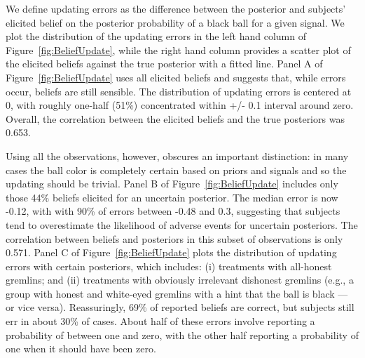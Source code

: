 \documentclass[12pt,a4paper]{article}
\begin{document}
We define updating errors as the difference between the posterior and subjects' elicited belief on the posterior probability of a black ball for a given signal.  We plot the distribution of the updating errors in the left hand column of Figure~\ref{fig:BeliefUpdate}, while the right hand column provides a scatter plot of the elicited beliefs against the true posterior with a fitted line.
Panel A of Figure~\ref{fig:BeliefUpdate} uses all elicited beliefs and suggests that, while errors occur, beliefs are still sensible. The distribution of updating errors is centered at 0, with roughly one-half (51\%) concentrated within +/- 0.1 interval around zero. Overall, the correlation between the elicited beliefs and the true posteriors was 0.653.  

Using all the observations, however, obscures an important distinction: in many cases the ball color is completely certain based on priors and signals and so the updating should be trivial.  Panel B of Figure~\ref{fig:BeliefUpdate} includes only those 44\% beliefs elicited for an uncertain posterior. The median error is now -0.12, with with 90\% of errors between -0.48 and 0.3, suggesting that subjects tend to overestimate the likelihood of adverse events for uncertain posteriors. The correlation between beliefs and posteriors in this subset of observations is only 0.571.  Panel C of Figure~\ref{fig:BeliefUpdate} plots the distribution of updating errors with certain posteriors, which includes: (i) treatments with all-honest gremlins; and (ii) treatments with obviously irrelevant dishonest gremlins (e.g., a group with honest and white-eyed gremlins with a hint that the ball is black --- or vice versa). Reassuringly, 69\% of reported beliefs are correct, but subjects still err in about 30\% of cases. About half of these errors involve reporting a probability of between one and zero, with the other half reporting a probability of one when it should have been zero.

\end{document}
